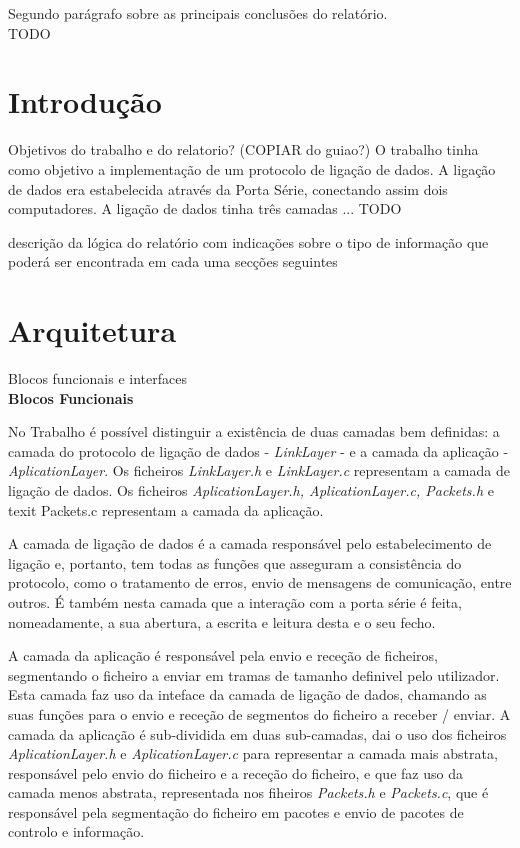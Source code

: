 \documentclass[a4paper]{article}
\begin{document}
Segundo parágrafo sobre as principais conclusões do relatório.\\
TODO
\newpage

\section{Introdução}

Objetivos do trabalho e do relatorio? (COPIAR do guiao?)
O trabalho tinha como objetivo a implementação de um protocolo de ligação de dados.
A ligação de dados era estabelecida através da Porta Série, conectando assim dois computadores.
A ligação de dados tinha três camadas ... TODO

descrição da lógica do relatório com indicações sobre o tipo de informação que poderá ser encontrada em cada uma secções seguintes
\newpage

\section{Arquitetura}

Blocos funcionais e interfaces\\

\large\textbf{Blocos Funcionais}\\
\normalsize 

No Trabalho é possível distinguir a existência de duas camadas bem definidas:  a camada do protocolo de ligação de dados - \textit{LinkLayer} - e a camada da aplicação - \textit{AplicationLayer}.
Os ficheiros \textit{LinkLayer.h} e  \textit{LinkLayer.c} representam a camada de ligação de dados. Os ficheiros \textit{AplicationLayer.h, AplicationLayer.c, Packets.h} e \\texit{ Packets.c} representam a camada da aplicação.

A camada de ligação de dados é a camada responsável pelo estabelecimento de ligação e, portanto, tem todas as funções que asseguram a consistência do protocolo, como o tratamento de erros, envio de mensagens de comunicação, entre outros. É também nesta camada que a interação com a porta série é feita, nomeadamente, a sua abertura, a escrita e leitura desta e o seu fecho.

A camada da aplicação é responsável pela envio e receção de ficheiros, segmentando o ficheiro a enviar em tramas de tamanho definivel pelo utilizador. Esta camada faz uso da inteface da camada de ligação de dados, chamando as suas funções para o envio e receção de segmentos do ficheiro a receber / enviar. A camada da aplicação é sub-dividida em duas sub-camadas, dai o uso dos ficheiros \textit{AplicationLayer.h} e \textit{AplicationLayer.c} para representar a camada mais abstrata, responsável pelo envio do fiicheiro e a receção do ficheiro, e que faz uso da camada menos abstrata, representada nos fiheiros  \textit{Packets.h} e \textit{Packets.c}, que é responsável pela segmentação do ficheiro em pacotes e envio de pacotes de controlo e informação.
\end{document}
